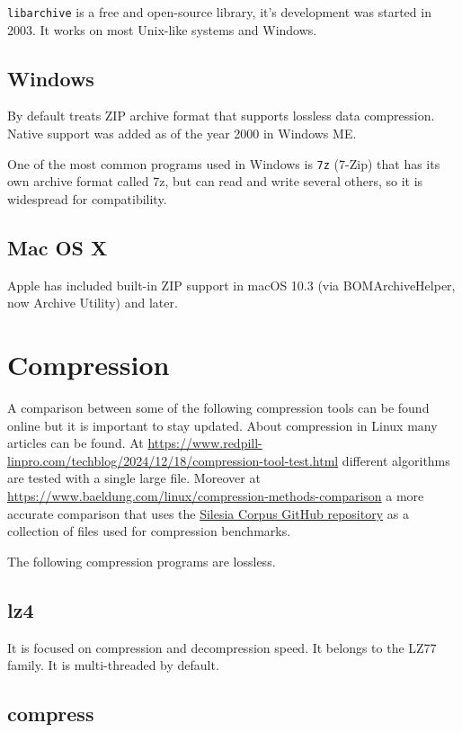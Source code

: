 \documentclass[12pt, a4paper]{report}
\begin{document}
\texttt{libarchive} is a free and open-source library, it's development was started in 2003.
It works on most Unix-like systems and Windows.

\subsection{Windows}

By default treats ZIP archive format that supports lossless data compression.
Native support was added as of the year 2000 in Windows ME.

One of the most common programs used in Windows is \texttt{7z} (7-Zip) that has its own archive format called 7z, but can read and
write several others, so it is widespread for compatibility.

\subsection{Mac OS X}

Apple has included built-in ZIP support in macOS 10.3 (via BOMArchiveHelper, now Archive Utility) and later.

\section{Compression}

A comparison between some of the following compression tools can be found online but it is important to stay updated.
About compression in Linux many articles can be found.
At \url{https://www.redpill-linpro.com/techblog/2024/12/18/compression-tool-test.html} different algorithms are tested with a
single large file.
Moreover at \url{https://www.baeldung.com/linux/compression-methods-comparison} a more accurate comparison that uses the
\href{https://github.com/MiloszKrajewski/SilesiaCorpus}{Silesia Corpus GitHub repository} as a collection of files used for
compression benchmarks.

The following compression programs are lossless.

\subsection{lz4}
\label{subsec:lz4}

It is focused on compression and decompression speed.
It belongs to the LZ77 family.
It is multi-threaded by default.

\subsection{compress}
\label{subsec:compress}
\end{document}
